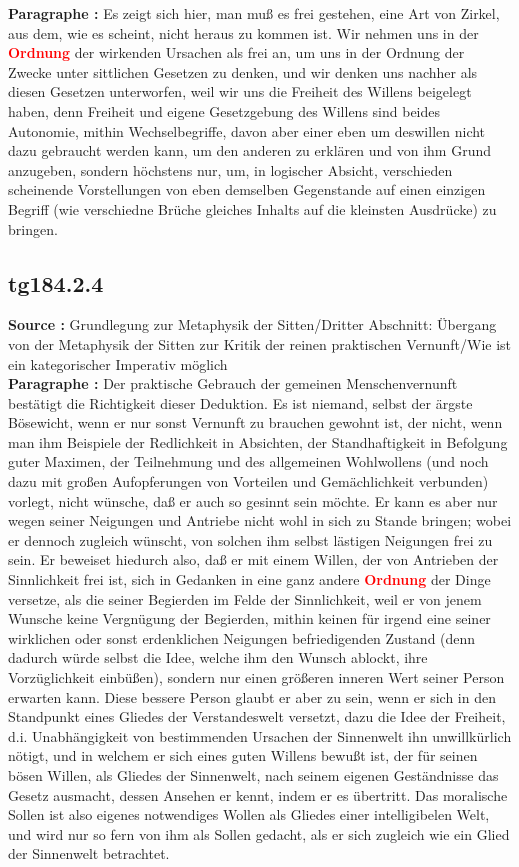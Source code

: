 \documentclass[a4paper,12pt,twoside]{book}
\newcommand{\match}[1]{\textcolor{red}{\textbf{#1}}}
\begin{document}
	\noindent\textbf{Paragraphe : }Es zeigt sich hier, man muß es frei gestehen, eine Art von Zirkel, aus dem, wie es scheint, nicht heraus zu kommen ist. Wir nehmen uns in der \match{Ordnung} der wirkenden Ursachen  als frei an, um uns in der Ordnung der Zwecke unter sittlichen Gesetzen zu denken, und wir denken uns nachher als diesen Gesetzen unterworfen, weil wir uns die Freiheit des Willens beigelegt haben, denn Freiheit und eigene Gesetzgebung des Willens sind beides Autonomie, mithin Wechselbegriffe, davon aber einer eben um deswillen nicht dazu gebraucht werden kann, um den anderen zu erklären und von ihm Grund anzugeben, sondern höchstens nur, um, in logischer Absicht, verschieden scheinende Vorstellungen von eben demselben Gegenstande auf einen einzigen Begriff (wie verschiedne Brüche gleiches Inhalts auf die kleinsten Ausdrücke) zu bringen. 
	
	\subsection*{tg184.2.4} 
	\textbf{Source : }Grundlegung zur Metaphysik der Sitten/Dritter Abschnitt: Übergang von der Metaphysik der Sitten zur Kritik der reinen praktischen Vernunft/Wie ist ein kategorischer Imperativ möglich\\  
	
	\noindent\textbf{Paragraphe : }Der praktische Gebrauch der gemeinen Menschenvernunft bestätigt die Richtigkeit dieser Deduktion. Es ist niemand, selbst der ärgste Bösewicht, wenn er nur sonst Vernunft  zu brauchen gewohnt ist, der nicht, wenn man ihm Beispiele der Redlichkeit in Absichten, der Standhaftigkeit in Befolgung guter Maximen, der Teilnehmung und des allgemeinen Wohlwollens (und noch dazu mit großen Aufopferungen von Vorteilen und Gemächlichkeit verbunden) vorlegt, nicht wünsche, daß er auch so gesinnt sein möchte. Er kann es aber nur wegen seiner Neigungen und Antriebe nicht wohl in sich zu Stande bringen; wobei er dennoch zugleich wünscht, von solchen ihm selbst lästigen Neigungen frei zu sein. Er beweiset hiedurch also, daß er mit einem Willen, der von Antrieben der Sinnlichkeit frei ist, sich in Gedanken in eine ganz andere \match{Ordnung} der Dinge versetze, als die seiner Begierden im Felde der Sinnlichkeit, weil er von jenem Wunsche keine Vergnügung der Begierden, mithin keinen für irgend eine seiner wirklichen oder sonst erdenklichen Neigungen befriedigenden Zustand (denn dadurch würde selbst die Idee, welche ihm den Wunsch ablockt, ihre Vorzüglichkeit einbüßen), sondern nur einen größeren inneren Wert seiner Person erwarten kann. Diese bessere Person glaubt er aber zu sein, wenn er sich in den Standpunkt eines Gliedes der Verstandeswelt versetzt, dazu die Idee der Freiheit, d.i. Unabhängigkeit von bestimmenden Ursachen der Sinnenwelt ihn unwillkürlich nötigt, und in welchem er sich eines guten Willens bewußt ist, der für seinen bösen Willen, als Gliedes der Sinnenwelt, nach seinem eigenen Geständnisse das Gesetz ausmacht, dessen Ansehen er kennt, indem er es übertritt. Das moralische Sollen ist also eigenes notwendiges Wollen als Gliedes einer intelligibelen Welt, und wird nur so fern von ihm als Sollen gedacht, als er sich zugleich wie ein Glied der Sinnenwelt betrachtet. 
	
\end{document}
